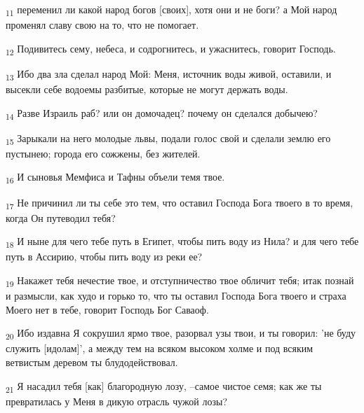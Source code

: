 \begin{tcolorbox}
\textsubscript{11} переменил ли какой народ богов [своих], хотя они и не боги? а Мой народ променял славу свою на то, что не помогает.
\end{tcolorbox}
\begin{tcolorbox}
\textsubscript{12} Подивитесь сему, небеса, и содрогнитесь, и ужаснитесь, говорит Господь.
\end{tcolorbox}
\begin{tcolorbox}
\textsubscript{13} Ибо два зла сделал народ Мой: Меня, источник воды живой, оставили, и высекли себе водоемы разбитые, которые не могут держать воды.
\end{tcolorbox}
\begin{tcolorbox}
\textsubscript{14} Разве Израиль раб? или он домочадец? почему он сделался добычею?
\end{tcolorbox}
\begin{tcolorbox}
\textsubscript{15} Зарыкали на него молодые львы, подали голос свой и сделали землю его пустынею; города его сожжены, без жителей.
\end{tcolorbox}
\begin{tcolorbox}
\textsubscript{16} И сыновья Мемфиса и Тафны объели темя твое.
\end{tcolorbox}
\begin{tcolorbox}
\textsubscript{17} Не причинил ли ты себе это тем, что оставил Господа Бога твоего в то время, когда Он путеводил тебя?
\end{tcolorbox}
\begin{tcolorbox}
\textsubscript{18} И ныне для чего тебе путь в Египет, чтобы пить воду из Нила? и для чего тебе путь в Ассирию, чтобы пить воду из реки ее?
\end{tcolorbox}
\begin{tcolorbox}
\textsubscript{19} Накажет тебя нечестие твое, и отступничество твое обличит тебя; итак познай и размысли, как худо и горько то, что ты оставил Господа Бога твоего и страха Моего нет в тебе, говорит Господь Бог Саваоф.
\end{tcolorbox}
\begin{tcolorbox}
\textsubscript{20} Ибо издавна Я сокрушил ярмо твое, разорвал узы твои, и ты говорил: 'не буду служить [идолам]', а между тем на всяком высоком холме и под всяким ветвистым деревом ты блудодействовал.
\end{tcolorbox}
\begin{tcolorbox}
\textsubscript{21} Я насадил тебя [как] благородную лозу, --самое чистое семя; как же ты превратилась у Меня в дикую отрасль чужой лозы?
\end{tcolorbox}
